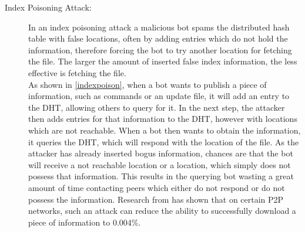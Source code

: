 \documentclass[10pt, a4paper, twocolumn]{article} %
\begin{document}
\begin{description}
\item[Index Poisoning Attack:] In an index poisoning attack a malicious bot spams the distributed hash table with false locations\cite{indexattack-def}, often by adding entries which do not hold the information, therefore forcing the bot to try another location for fetching the file. The larger the amount of inserted false index information, the less effective is fetching the file. \\
As shown in \autoref{indexpoison}, when a bot wants to publish a piece of information, such as commands or an update file, it will add an entry to the DHT, allowing others to query for it. In the next step, the attacker then adds entries for that information to the DHT, however with locations which are not reachable. When a bot then wants to obtain the information, it queries the DHT, which will respond with the location of the file. As the attacker has already inserted bogus information, chances are that the bot will receive a not reachable location or a location, which simply does not possess that information. This results in the querying bot wasting a great amount of time contacting peers which either do not respond or do not possess the information. Research from \citet{indexattack} has shown that on certain P2P networks, such an attack can reduce the ability to successfully download a piece of information to 0.004\%.  

\end{description}
\end{document}

